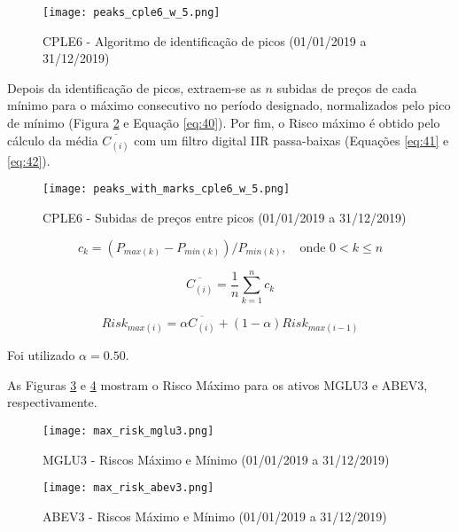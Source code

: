 \begin{itemize}
    \begin{figure}[!htb]
        \texttt{[image: peaks\_cple6\_w\_5.png]}
        \centering
        \caption{CPLE6 - Algoritmo de identificação de picos (01/01/2019 a 31/12/2019)}
        \label{fig:106}
    \end{figure}

    Depois da identificação de picos, extraem-se as \begin{math} n \end{math} subidas de preços de cada mínimo para o máximo consecutivo no período designado, normalizados pelo pico de mínimo (Figura \ref{fig:107} e Equação \ref{eq:40}). Por fim, o Risco máximo é obtido pelo cálculo da média \begin{math} \overline{C_{(i)}} \end{math} com um filtro digital IIR passa-baixas (Equações \ref{eq:41} e \ref{eq:42}).

    \begin{figure}[!htb]
        \texttt{[image: peaks\_with\_marks\_cple6\_w\_5.png]}
        \centering
        \caption{CPLE6 - Subidas de preços entre picos (01/01/2019 a 31/12/2019)}
        \label{fig:107}
    \end{figure}

    \begin{equation} \label{eq:40}
        c_k = (P_{max(k)} - P_{min(k)}) / P_{min(k)}, \quad \textrm{onde } 0 < k \le n
    \end{equation}

    \begin{equation} \label{eq:41}
        \overline{C_{(i)}} = \dfrac{1}{n} \sum_{k=1}^{n} c_k
    \end{equation}

    \begin{equation} \label{eq:42}
        Risk_{max(i)} = \alpha \overline{C_{(i)}} + (1 - \alpha) Risk_{max(i-1)}
    \end{equation}

    Foi utilizado \begin{math} \alpha = 0.50 \end{math}.

    As Figuras \ref{fig:108} e \ref{fig:270} mostram o Risco Máximo para os ativos MGLU3 e ABEV3, respectivamente.

    \begin{figure}[!htb]
        \texttt{[image: max\_risk\_mglu3.png]}
        \centering
        \caption{MGLU3 - Riscos Máximo e Mínimo (01/01/2019 a 31/12/2019)}
        \label{fig:108}
    \end{figure}

    \begin{figure}[!htb]
        \texttt{[image: max\_risk\_abev3.png]}
        \centering
        \caption{ABEV3 - Riscos Máximo e Mínimo (01/01/2019 a 31/12/2019)}
        \label{fig:270}
    \end{figure}

\end{itemize}




